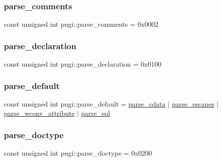 \subsubsection{\texorpdfstring{parse\+\_\+comments}{parse\_comments}}
{\footnotesize\ttfamily const unsigned int pugi\+::parse\+\_\+comments = 0x0002}

\mbox{\label{namespacepugi_adb5db03ce720dcd90e900b9bb7e70427}} 
\subsubsection{\texorpdfstring{parse\+\_\+declaration}{parse\_declaration}}
{\footnotesize\ttfamily const unsigned int pugi\+::parse\+\_\+declaration = 0x0100}

\mbox{\label{namespacepugi_ad7c927d1c1752330637c3318b0d7b366}} 
\subsubsection{\texorpdfstring{parse\+\_\+default}{parse\_default}}
{\footnotesize\ttfamily const unsigned int pugi\+::parse\+\_\+default = \hyperlink{namespacepugi_a47b679897f8bc15e4e152978fc88c208}{parse\+\_\+cdata} $\vert$ \hyperlink{namespacepugi_ab5ef8454110599611900ff48012c8ad6}{parse\+\_\+escapes} $\vert$ \hyperlink{namespacepugi_a1e943812f2de36fc3ee14f7756afdbd7}{parse\+\_\+wconv\+\_\+attribute} $\vert$ \hyperlink{namespacepugi_ad4e017365d2ff3ee04e226c35129b475}{parse\+\_\+eol}}

\mbox{\label{namespacepugi_afa993ffcd3e228d21f48071e7c097f32}} 
\subsubsection{\texorpdfstring{parse\+\_\+doctype}{parse\_doctype}}
{\footnotesize\ttfamily const unsigned int pugi\+::parse\+\_\+doctype = 0x0200}

\mbox{\label{namespacepugi_a80a72fa1dbed77775ec0498b23246d8d}} 
